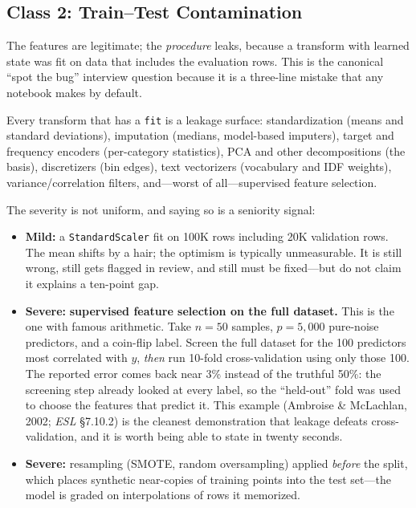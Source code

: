 \subsection{Class 2: Train--Test Contamination}

The features are legitimate; the \emph{procedure} leaks, because a transform with learned state was fit on data that includes the evaluation rows. This is the canonical ``spot the bug'' interview question because it is a three-line mistake that any notebook makes by default.

Every transform that has a \texttt{fit} is a leakage surface: standardization (means and standard deviations), imputation (medians, model-based imputers), target and frequency encoders (per-category statistics), PCA and other decompositions (the basis), discretizers (bin edges), text vectorizers (vocabulary and IDF weights), variance/correlation filters, and---worst of all---supervised feature selection.

The severity is not uniform, and saying so is a seniority signal:
\begin{itemize}
    \item \textbf{Mild:} a \texttt{StandardScaler} fit on 100K rows including 20K validation rows. The mean shifts by a hair; the optimism is typically unmeasurable. It is still wrong, still gets flagged in review, and still must be fixed---but do not claim it explains a ten-point gap.
    \item \textbf{Severe:} \textbf{supervised feature selection on the full dataset.} This is the one with famous arithmetic. Take $n = 50$ samples, $p = 5{,}000$ pure-noise predictors, and a coin-flip label. Screen the full dataset for the 100 predictors most correlated with $y$, \emph{then} run 10-fold cross-validation using only those 100. The reported error comes back near 3\% instead of the truthful 50\%: the screening step already looked at every label, so the ``held-out'' fold was used to choose the features that predict it. This example (Ambroise \& McLachlan, 2002; \emph{ESL} \S7.10.2) is the cleanest demonstration that leakage defeats cross-validation, and it is worth being able to state in twenty seconds.
    \item \textbf{Severe:} resampling (SMOTE, random oversampling) applied \emph{before} the split, which places synthetic near-copies of training points into the test set---the model is graded on interpolations of rows it memorized.
\end{itemize}

